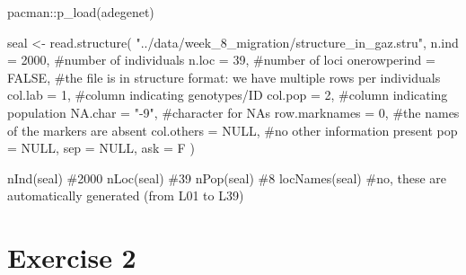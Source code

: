 \documentclass[
  letterpaper,
  DIV=11,
  numbers=noendperiod]{scrreprt}
\newenvironment{Shaded}{}{}
\newcommand{\AttributeTok}[1]{\textcolor[rgb]{0.84,0.23,0.29}{#1}}
\newcommand{\CommentTok}[1]{\textcolor[rgb]{0.42,0.45,0.49}{#1}}
\newcommand{\ConstantTok}[1]{\textcolor[rgb]{0.00,0.36,0.77}{#1}}
\newcommand{\DecValTok}[1]{\textcolor[rgb]{0.00,0.36,0.77}{#1}}
\newcommand{\FunctionTok}[1]{\textcolor[rgb]{0.44,0.26,0.76}{#1}}
\newcommand{\NormalTok}[1]{\textcolor[rgb]{0.14,0.16,0.18}{#1}}
\newcommand{\OtherTok}[1]{\textcolor[rgb]{0.44,0.26,0.76}{#1}}
\newcommand{\SpecialCharTok}[1]{\textcolor[rgb]{0.00,0.36,0.77}{#1}}
\newcommand{\StringTok}[1]{\textcolor[rgb]{0.01,0.18,0.38}{#1}}
\begin{document}
\begin{tcolorbox}[enhanced jigsaw, arc=.35mm, left=2mm, titlerule=0mm, rightrule=.15mm, colframe=quarto-callout-tip-color-frame, coltitle=black, colback=white, opacityback=0, bottomtitle=1mm, bottomrule=.15mm, colbacktitle=quarto-callout-tip-color!10!white, breakable, title=\textcolor{quarto-callout-tip-color}{\faLightbulb}\hspace{0.5em}{Code and answer}, toptitle=1mm, toprule=.15mm, opacitybacktitle=0.6, leftrule=.75mm]

\begin{Shaded}
\begin{Highlighting}[]
\NormalTok{pacman}\SpecialCharTok{::}\FunctionTok{p\_load}\NormalTok{(adegenet)}

\NormalTok{seal }\OtherTok{\textless{}{-}} \FunctionTok{read.structure}\NormalTok{(}
  \StringTok{"../data/week\_8\_migration/structure\_in\_gaz.stru"}\NormalTok{,}
  \AttributeTok{n.ind =}  \DecValTok{2000}\NormalTok{, }\CommentTok{\#number of individuals}
  \AttributeTok{n.loc =} \DecValTok{39}\NormalTok{, }\CommentTok{\#number of loci}
  \AttributeTok{onerowperind =} \ConstantTok{FALSE}\NormalTok{, }\CommentTok{\#the file is in structure format: we have multiple rows per individuals}
  \AttributeTok{col.lab =} \DecValTok{1}\NormalTok{, }\CommentTok{\#column indicating genotypes/ID}
  \AttributeTok{col.pop =} \DecValTok{2}\NormalTok{, }\CommentTok{\#column indicating population}
  \AttributeTok{NA.char =} \StringTok{"{-}9"}\NormalTok{, }\CommentTok{\#character for NAs}
  \AttributeTok{row.marknames =} \DecValTok{0}\NormalTok{, }\CommentTok{\#the names of the markers are absent}
  \AttributeTok{col.others =} \ConstantTok{NULL}\NormalTok{, }\CommentTok{\#no other information present}
  \AttributeTok{pop =} \ConstantTok{NULL}\NormalTok{, }\AttributeTok{sep =} \ConstantTok{NULL}\NormalTok{, }\AttributeTok{ask =}\NormalTok{ F }
\NormalTok{)}

\FunctionTok{nInd}\NormalTok{(seal) }\CommentTok{\#2000}
\FunctionTok{nLoc}\NormalTok{(seal) }\CommentTok{\#39}
\FunctionTok{nPop}\NormalTok{(seal) }\CommentTok{\#8}
\FunctionTok{locNames}\NormalTok{(seal) }\CommentTok{\#no, these are automatically generated (from L01 to L39)}
\end{Highlighting}
\end{Shaded}

\end{tcolorbox}

\section{Exercise 2}\label{exercise-2}
\end{document}
